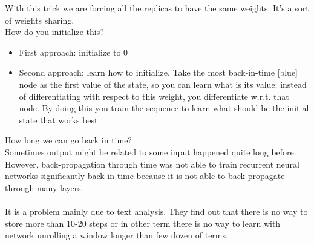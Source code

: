 
With this trick we are forcing all the replicas to have the same weights. It's a sort of weights sharing. \\ 


How do you initialize this? 
\begin{itemize}
    \item First approach: initialize to 0
    \item Second approach: learn how to initialize. Take the most back-in-time [blue] node as the first value of the state, so you can learn what is its value: instead of differentiating with respect to this weight, you differentiate w.r.t. that node. By doing this you train the sequence to learn what should be the initial state that works best. 
\end{itemize}{}

How long we can go back in time? \\
Sometimes output might be related to some input happened quite long before. However, back-propagation through time was not able to train recurrent neural networks significantly back in time because it is not able to back-propagate through many layers. \\ \\
It is a problem mainly due to text analysis. They find out that there is no way to store more than 10-20 steps or in other term there is no way to learn with network unrolling a window longer than few dozen of terms. \\ 

